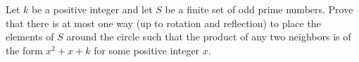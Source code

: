 Let $k$ be a positive integer and let $S$ be a finite set of odd prime numbers.
Prove that there is at most one way (up to rotation and reflection)
to place the elements of $S$ around the circle such that the product
of any two neighbors is of the form $x^2+x+k$ for some positive integer $x$.